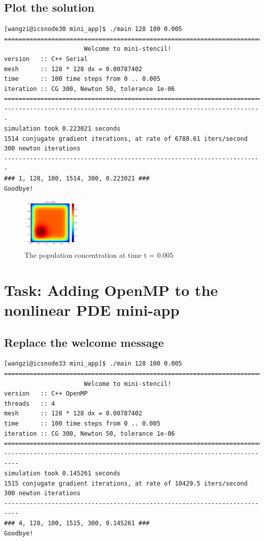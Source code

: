 \documentclass[unicode,11pt,a4paper,oneside,numbers=endperiod,openany]{scrartcl}
\begin{document}
\subsection{Plot the solution}
\begin{lstlisting}[language=MyC++, style=mystyle, caption={Mini-Stencil Program Output}]
[wangzi@icsnode30 mini_app]$ ./main 128 100 0.005
=======================================================================
                      Welcome to mini-stencil!
version   :: C++ Serial
mesh      :: 128 * 128 dx = 0.00787402
time      :: 100 time steps from 0 .. 0.005
iteration :: CG 300, Newton 50, tolerance 1e-06
=======================================================================
-----------------------------------------------------------------------
simulation took 0.223021 seconds
1514 conjugate gradient iterations, at rate of 6788.61 iters/second
300 newton iterations
-----------------------------------------------------------------------
### 1, 128, 100, 1514, 300, 0.223021 ###
Goodbye!
\end{lstlisting}
\begin{figure}[h]
  \centering
  \includegraphics[width=0.25\textwidth]{pictures/output.png}
  \caption{The population concentration at time t = 0.005}
\end{figure}

\section{Task:  Adding OpenMP to the nonlinear PDE mini-app}
\subsection{Replace the welcome message}
\begin{lstlisting}[language=MyC++, style=mystyle, caption={Mini-Stencil Program Output with OpenMP}]
[wangzi@icsnode33 mini_app]$ ./main 128 100 0.005
==========================================================================
                      Welcome to mini-stencil!
version   :: C++ OpenMP
threads   :: 4
mesh      :: 128 * 128 dx = 0.00787402
time      :: 100 time steps from 0 .. 0.005
iteration :: CG 300, Newton 50, tolerance 1e-06
==========================================================================
--------------------------------------------------------------------------
simulation took 0.145261 seconds
1515 conjugate gradient iterations, at rate of 10429.5 iters/second
300 newton iterations
--------------------------------------------------------------------------
### 4, 128, 100, 1515, 300, 0.145261 ###
Goodbye!
\end{lstlisting}
\end{document}
